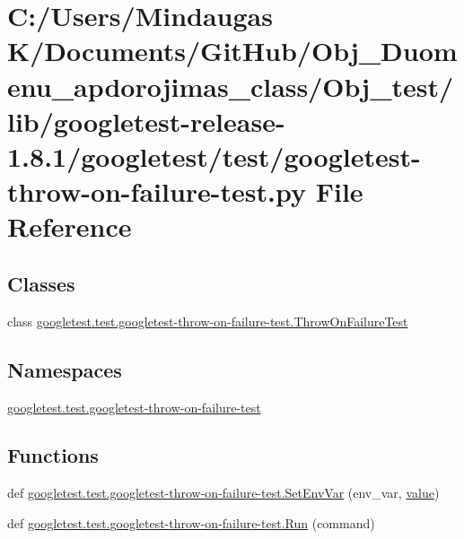 \hypertarget{_obj__test_2lib_2googletest-release-1_88_81_2googletest_2test_2googletest-throw-on-failure-test_8py}{}\section{C\+:/\+Users/\+Mindaugas K/\+Documents/\+Git\+Hub/\+Obj\+\_\+\+Duomenu\+\_\+apdorojimas\+\_\+class/\+Obj\+\_\+test/lib/googletest-\/release-\/1.8.1/googletest/test/googletest-\/throw-\/on-\/failure-\/test.py File Reference}
\label{_obj__test_2lib_2googletest-release-1_88_81_2googletest_2test_2googletest-throw-on-failure-test_8py}
\subsection*{Classes}
\begin{DoxyCompactItemize}
\item 
class \mbox{\hyperlink{classgoogletest_1_1test_1_1googletest-throw-on-failure-test_1_1_throw_on_failure_test}{googletest.\+test.\+googletest-\/throw-\/on-\/failure-\/test.\+Throw\+On\+Failure\+Test}}
\end{DoxyCompactItemize}
\subsection*{Namespaces}
\begin{DoxyCompactItemize}
\item 
 \mbox{\hyperlink{namespacegoogletest_1_1test_1_1googletest-throw-on-failure-test}{googletest.\+test.\+googletest-\/throw-\/on-\/failure-\/test}}
\end{DoxyCompactItemize}
\subsection*{Functions}
\begin{DoxyCompactItemize}
\item 
def \mbox{\hyperlink{namespacegoogletest_1_1test_1_1googletest-throw-on-failure-test_af4414910b3110bee15ecd5463f02bd9d}{googletest.\+test.\+googletest-\/throw-\/on-\/failure-\/test.\+Set\+Env\+Var}} (env\+\_\+var, \mbox{\hyperlink{_obj__test_2lib_2googletest-master_2googlemock_2test_2gmock-matchers__test_8cc_a337b8a670efc0b086ad3af163f3121b6}{value}})
\item 
def \mbox{\hyperlink{namespacegoogletest_1_1test_1_1googletest-throw-on-failure-test_a8f6f5f7c354ddfb17bb80259fae9a4e3}{googletest.\+test.\+googletest-\/throw-\/on-\/failure-\/test.\+Run}} (command)
\end{DoxyCompactItemize}
